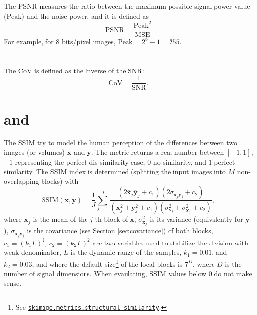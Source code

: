 
\section{}

The \acrshort{PSNR} measures the ratio between the maximum possible signal power
value ($\text{Peak}$) and the noise power, and it is defined as
\begin{equation}
  \text{PSNR} = \frac{\text{Peak}^2}{\text{MSE}}
  \label{eq:PSNR}
\end{equation}
For example, for 8 bits/pixel images, $\text{Peak}=2^8-1=255$.


\section{}
The \gls{CoV} is defined as the inverse of the \gls{SNR}:
\begin{equation}
  \text{CoV} = \frac{1}{\text{SNR}}.
\end{equation}

\section{ and }

The \acrshort{SSIM} \cite{wang2004image} try to model the human
perception of the differences between two images (or volumes)
$\mathbf{x}$ and $\mathbf{y}$. The metric returns a real number
between $[-1, 1]$, $-1$ representing the perfect dis-similarity case,
$0$ no similarity, and $1$ perfect similarity. The \gls{SSIM} index is
determined (splitting the input images into $M$ non-overlapping
blocks) with
\begin{equation}
  \text{SSIM}(\mathbf{x}, \mathbf{y}) = \frac{1}{J} \sum_{j=1}^J \frac{(2\overline{\mathbf{x}}_j \overline{\mathbf{y}}_j + c_1)(2\sigma_{\mathbf{x}_j \mathbf{y}_j} + c_2)}{(\overline{\mathbf{x}_j^2} + \overline{\mathbf{y}_j^2} + c_1)(\sigma^2_{\mathbf{x}_j} + \sigma^2_{\mathbf{y}_j} + c_2)},
\end{equation}
where $\overline{\mathbf x}_j$ is the mean of the $j$-th block of
$\mathbf{x}$, $\sigma^2_{\mathbf{x}_j}$ is its variance (equivalently
for $\mathbf{y}$), $\sigma_{\mathbf{x}_j\mathbf{y}_j}$ is the
covariance (see Section \ref{sec:covariance}) of both blocks,
$c_1=(k_1L)^2$, $c_2=(k_2L)^2$ are two variables used to stabilize the
division with weak denominator, $L$ is the dynamic range of the
samples, $k_1=0.01$, and $k_2=0.03$, and where the default
size\footnote{See
  \href{https://scikit-image.org/docs/stable/api/skimage.metrics.html\#skimage.metrics.structural_similarity}{\texttt{skimage.metrics.structural\_similarity}}.}
of the local blocks is $7^D$, where $D$ is the number of signal
dimensions. When evaulating, \gls{SSIM} values below $0$ do not make
sense.

